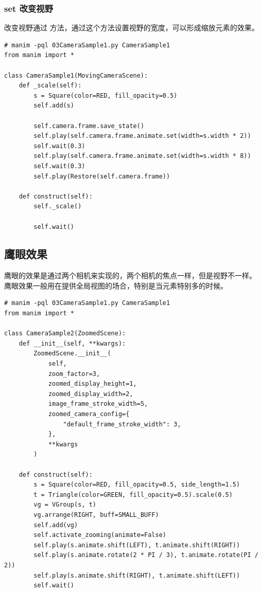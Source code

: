 \subsubsection{set 改变视野}
\label{subsubsec:manim_animation_camera_move_set}
改变视野通过 方法，通过这个方法设置视野的宽度，可以形成缩放元素的效果。

\begin{lstlisting}[style=pythonstyle]
# manim -pql 03CameraSample1.py CameraSample1  
from manim import *

class CameraSample1(MovingCameraScene):
    def _scale(self):
        s = Square(color=RED, fill_opacity=0.5)
        self.add(s)

        self.camera.frame.save_state()
        self.play(self.camera.frame.animate.set(width=s.width * 2))
        self.wait(0.3)
        self.play(self.camera.frame.animate.set(width=s.width * 8))
        self.wait(0.3)
        self.play(Restore(self.camera.frame))

    def construct(self):
        self._scale()

        self.wait()
\end{lstlisting}

\subsection{鹰眼效果}
\label{subsec:manim_animation_camera_birdseye}
鹰眼的效果是通过两个相机来实现的，两个相机的焦点一样，但是视野不一样。 鹰眼效果一般用在提供全局视图的场合，特别是当元素特别多的时候。

\begin{lstlisting}[style=pythonstyle]
# manim -pql 03CameraSample1.py CameraSample1  
from manim import *

class CameraSample2(ZoomedScene):
    def __init__(self, **kwargs):
        ZoomedScene.__init__(
            self,
            zoom_factor=3,
            zoomed_display_height=1,
            zoomed_display_width=2,
            image_frame_stroke_width=5,
            zoomed_camera_config={
                "default_frame_stroke_width": 3,
            },
            **kwargs
        )

    def construct(self):
        s = Square(color=RED, fill_opacity=0.5, side_length=1.5)
        t = Triangle(color=GREEN, fill_opacity=0.5).scale(0.5)
        vg = VGroup(s, t)
        vg.arrange(RIGHT, buff=SMALL_BUFF)
        self.add(vg)
        self.activate_zooming(animate=False)
        self.play(s.animate.shift(LEFT), t.animate.shift(RIGHT))
        self.play(s.animate.rotate(2 * PI / 3), t.animate.rotate(PI / 2))
        self.play(s.animate.shift(RIGHT), t.animate.shift(LEFT))
        self.wait()
\end{lstlisting}

